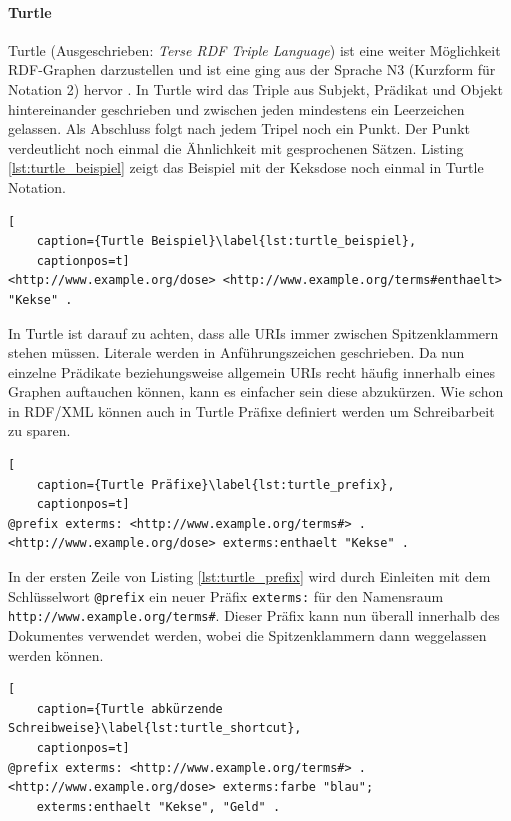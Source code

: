 \paragraph{Turtle} %
\label{par:turtle}

Turtle (Ausgeschrieben: \emph{Terse RDF Triple Language}) ist eine weiter Möglichkeit RDF-Graphen darzustellen und ist eine ging aus der Sprache N3 (Kurzform für Notation 2) hervor \cite{DavidBeckett}. In Turtle wird das Triple aus Subjekt, Prädikat und Objekt hintereinander geschrieben und zwischen jeden mindestens ein Leerzeichen gelassen. Als Abschluss folgt nach jedem Tripel noch ein Punkt. Der Punkt verdeutlicht noch einmal die Ähnlichkeit mit gesprochenen Sätzen. Listing \ref{lst:turtle_beispiel} zeigt das Beispiel mit der Keksdose noch einmal in Turtle Notation. 

\begin{lstlisting}[
    caption={Turtle Beispiel}\label{lst:turtle_beispiel},
    captionpos=t]
<http://www.example.org/dose> <http://www.example.org/terms#enthaelt> "Kekse" .
\end{lstlisting} 

In Turtle ist darauf zu achten, dass alle URIs immer zwischen Spitzenklammern stehen müssen. Literale werden in Anführungszeichen geschrieben. Da nun einzelne Prädikate beziehungsweise allgemein URIs recht häufig innerhalb eines Graphen auftauchen können, kann es einfacher sein diese abzukürzen. Wie schon in RDF/XML können auch in Turtle Präfixe definiert werden um Schreibarbeit zu sparen.

\begin{lstlisting}[
    caption={Turtle Präfixe}\label{lst:turtle_prefix},
    captionpos=t]
@prefix exterms: <http://www.example.org/terms#> .
<http://www.example.org/dose> exterms:enthaelt "Kekse" .   
\end{lstlisting}

In der ersten Zeile von Listing \ref{lst:turtle_prefix} wird durch Einleiten mit dem Schlüsselwort \texttt{@prefix} ein neuer Präfix \texttt{exterms:} für den Namensraum \texttt{http://www.example.org/terms\#}. Dieser Präfix kann nun überall innerhalb des Dokumentes verwendet werden, wobei die Spitzenklammern dann weggelassen werden können.

\begin{lstlisting}[
    caption={Turtle abkürzende Schreibweise}\label{lst:turtle_shortcut},
    captionpos=t]
@prefix exterms: <http://www.example.org/terms#> .
<http://www.example.org/dose> exterms:farbe "blau";
    exterms:enthaelt "Kekse", "Geld" .   
\end{lstlisting}

